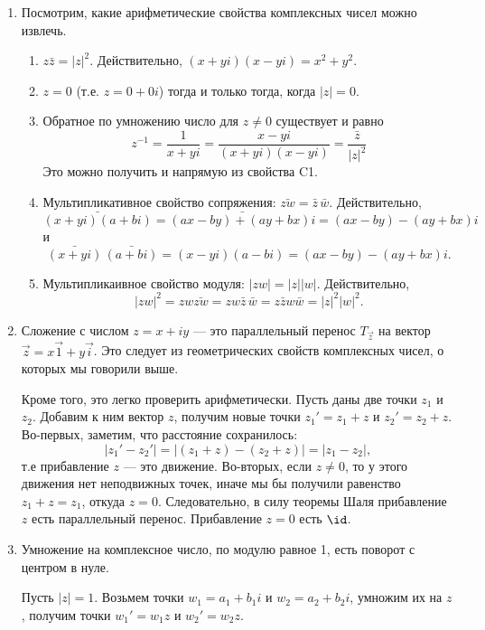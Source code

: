 \begin{enumerate}
\begin{center}
\end{center}
\item Посмотрим, какие арифметические свойства комплексных чисел можно извлечь.
\begin{enumerate}[\bf C1)]
\item $z\bar z=|z|^2$. Действительно, $(x+yi)(x-yi)=x^2+y^2$.
\item $z=0$ (т.е. $z=0+0i$) тогда и только тогда, когда $|z|=0$.
\item Обратное по умножению число для $z\ne 0$ существует и равно
$$
z^{-1} = \frac{1}{x+yi}=\frac{x-yi}{(x+yi)(x-yi)}=\frac{\bar z}{|z|^2}
$$
Это можно получить и напрямую из свойства C1.
\item Мультипликативное свойство сопряжения: $\bar{zw}=\bar{z}\,\bar{w}$. Действительно,
$$ 
\bar{(x+yi)(a+bi)} = \bar{(ax-by)+(ay+bx)i} = (ax-by)-(ay+bx)i
$$
и
$$
\bar{(x+yi)}\,\bar{(a+bi)} = (x-yi)(a-bi) = (ax-by)-(ay+bx)i.
$$
\item Мультипликаивное свойство модуля: $|zw|=|z||w|$. Действительно,
$$
|zw|^2 = zw\bar{zw} = zw\bar{z}\,\bar{w} = z\bar{z}w\bar{w} = |z|^2|w|^2.
$$
\end{enumerate}




\item Сложение с числом $z=x+iy$ --- это параллельный перенос $T_{\vec z}$ на вектор $\vec z=x\vec 1+y\vec i$. Это следует из геометрических свойств комплексных чисел, о которых мы говорили выше.

Кроме того, это легко проверить арифметически. Пусть даны две точки $z_1$ и $z_2$. Добавим к ним вектор $z$, получим новые точки $z_1'=z_1+z$ и $z_2'=z_2+z$. Во-первых, заметим, что расстояние сохранилось:
$$
|z_1'-z_2'| = |(z_1+z)-(z_2+z)| = |z_1-z_2|,
$$
т.е прибавление $z$ --- это движение. Во-вторых, если $z\ne 0$, то у этого движения нет неподвижных точек, иначе мы бы получили равенство $z_1+z=z_1$, откуда $z=0$. Следовательно, в силу теоремы Шаля прибавление $z$ есть параллельный перенос. Прибавление $z=0$ есть $\id$.

\item Умножение на комплексное число, по модулю равное 1, есть поворот с центром в нуле.

Пусть $|z|=1$. Возьмем точки $w_1=a_1+b_1i$ и $w_2=a_2+b_2i$,  умножим их на $z$, получим точки $w_1'=w_1z$ и $w_2'=w_2z$.


\end{enumerate}
